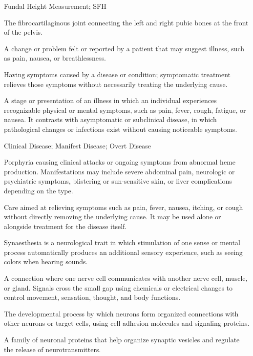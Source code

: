 \synonyms
Fundal Height Measurement; SFH

 The fibrocartilaginous joint connecting the left and right pubic bones at the front of the pelvis.

 A change or problem felt or reported by a patient that may suggest illness, such as pain, nausea, or breathlessness.

 Having symptoms caused by a disease or condition; symptomatic treatment relieves those symptoms without necessarily treating the underlying cause.

 A stage or presentation of an illness in which an individual experiences recognizable physical or mental symptoms, such as pain, fever, cough, fatigue, or nausea. It contrasts with asymptomatic or subclinical disease, in which pathological changes or infections exist without causing noticeable symptoms.

\synonyms
Clinical Disease; Manifest Disease; Overt Disease

 Porphyria causing clinical attacks or ongoing symptoms from abnormal heme production. Manifestations may include severe abdominal pain, neurologic or psychiatric symptoms, blistering or sun-sensitive skin, or liver complications depending on the type.

 Care aimed at relieving symptoms such as pain, fever, nausea, itching, or cough without directly removing the underlying cause. It may be used alone or alongside treatment for the disease itself.

 Synaesthesia is a neurological trait in which stimulation of one sense or mental process automatically produces an additional sensory experience, such as seeing colors when hearing sounds.

 A connection where one nerve cell communicates with another nerve cell, muscle, or gland. Signals cross the small gap using chemicals or electrical changes to control movement, sensation, thought, and body functions.

 The developmental process by which neurons form organized connections with other neurons or target cells, using cell-adhesion molecules and signaling proteins.

 A family of neuronal proteins that help organize synaptic vesicles and regulate the release of neurotransmitters.

